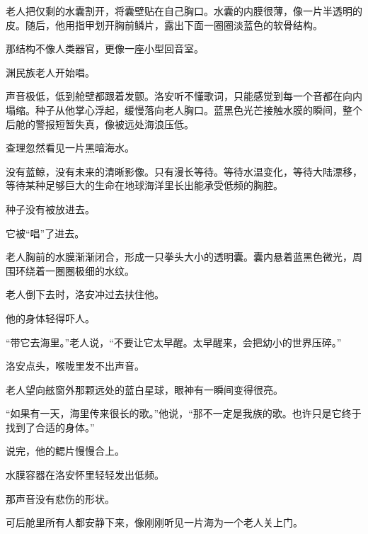 老人把仅剩的水囊割开，将囊壁贴在自己胸口。水囊的内膜很薄，像一片半透明的皮。随后，他用指甲划开胸前鳞片，露出下面一圈圈淡蓝色的软骨结构。

那结构不像人类器官，更像一座小型回音室。

渊民族老人开始唱。

声音极低，低到舱壁都跟着发颤。洛安听不懂歌词，只能感觉到每一个音都在向内塌缩。种子从他掌心浮起，缓慢落向老人胸口。蓝黑色光芒接触水膜的瞬间，整个后舱的警报短暂失真，像被远处海浪压低。

查理忽然看见一片黑暗海水。

没有蓝鲸，没有未来的清晰影像。只有漫长等待。等待水温变化，等待大陆漂移，等待某种足够巨大的生命在地球海洋里长出能承受低频的胸腔。

种子没有被放进去。

它被“唱”了进去。

老人胸前的水膜渐渐闭合，形成一只拳头大小的透明囊。囊内悬着蓝黑色微光，周围环绕着一圈圈极细的水纹。

老人倒下去时，洛安冲过去扶住他。

他的身体轻得吓人。

“带它去海里。”老人说，“不要让它太早醒。太早醒来，会把幼小的世界压碎。”

洛安点头，喉咙里发不出声音。

老人望向舷窗外那颗远处的蓝白星球，眼神有一瞬间变得很亮。

“如果有一天，海里传来很长的歌。”他说，“那不一定是我族的歌。也许只是它终于找到了合适的身体。”

说完，他的鳃片慢慢合上。

水膜容器在洛安怀里轻轻发出低频。

那声音没有悲伤的形状。

可后舱里所有人都安静下来，像刚刚听见一片海为一个老人关上门。
